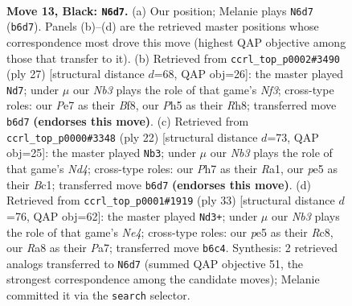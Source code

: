 \documentclass[11pt]{article}
\begin{document}
\clearpage

\begin{figure}[p]\centering
\begin{subfigure}{0.46\textwidth}\centering
\resizebox{\linewidth}{!}{%
\newchessgame
\chessboard[
  setfen={rnbr2k1/ppp1ppbp/1n6/P3P2p/2P5/1B3N2/1P3PP1/RNB1K2R b KQ - 0 13},
  showmover=false,
  pgfstyle=straightmove, color=movearrow, markmove={b6-d7}
]}
\caption{}
\end{subfigure}\hfill
\begin{subfigure}{0.46\textwidth}\centering
\resizebox{\linewidth}{!}{%
\newchessgame
\chessboard[
  setfen={2kr1b1r/ppp2ppp/2n2n2/4P3/5N2/5NP1/PPP4P/R1B2K1R b - - 0 14},
  showmover=false,
  pgfstyle=straightmove, color=movearrow, markmove={f6-d7}
]}
\caption{}
\end{subfigure}
\\[4pt]
\begin{subfigure}{0.46\textwidth}\centering
\resizebox{\linewidth}{!}{%
\newchessgame
\chessboard[
  setfen={r3k2r/pppb1pbp/6p1/2n1p3/2BNP3/2P5/PP3PPP/R1BKR3 w kq - 0 12},
  showmover=false,
  pgfstyle=straightmove, color=movearrow, markmove={d4-b3}
]}
\caption{}
\end{subfigure}\hfill
\begin{subfigure}{0.46\textwidth}\centering
\resizebox{\linewidth}{!}{%
\newchessgame
\chessboard[
  setfen={2rr2k1/pp2ppb1/6p1/2P1n2p/bPP1pP2/1N2P3/PB2B1PP/1R2K2R b K f3 0 17},
  showmover=false,
  pgfstyle=straightmove, color=movearrow, markmove={e5-d3}
]}
\caption{}
\end{subfigure}
\caption{\textbf{Move 13, Black: \texttt{N6d7}.} (a) Our position; Melanie plays \texttt{N6d7} (\texttt{b6d7}). Panels (b)--(d) are the retrieved master positions whose correspondence most drove this move (highest QAP objective among those that transfer to it). (b) Retrieved from \texttt{ccrl\_top\_p0002\#3490} (ply 27) [structural distance $d$=68, QAP obj=26]: the master played \texttt{Nd7}; under $\mu$ our \emph{Nb3} plays the role of that game's \emph{Nf3}; cross-type roles: our \emph{P}e7 as their \emph{B}f8, our \emph{P}h5 as their \emph{R}h8; transferred move \texttt{b6d7} \textbf{(endorses this move)}. (c) Retrieved from \texttt{ccrl\_top\_p0000\#3348} (ply 22) [structural distance $d$=73, QAP obj=25]: the master played \texttt{Nb3}; under $\mu$ our \emph{Nb3} plays the role of that game's \emph{Nd4}; cross-type roles: our \emph{P}h7 as their \emph{R}a1, our \emph{p}e5 as their \emph{B}c1; transferred move \texttt{b6d7} \textbf{(endorses this move)}. (d) Retrieved from \texttt{ccrl\_top\_p0001\#1919} (ply 33) [structural distance $d$=76, QAP obj=62]: the master played \texttt{Nd3+}; under $\mu$ our \emph{Nb3} plays the role of that game's \emph{Ne4}; cross-type roles: our \emph{p}e5 as their \emph{R}c8, our \emph{R}a8 as their \emph{P}a7; transferred move \texttt{b6c4}. Synthesis: 2 retrieved analogs transferred to \texttt{N6d7} (summed QAP objective 51, the strongest correspondence among the candidate moves); Melanie committed it via the \texttt{search} selector.}
\label{fig:thought-m25}
\end{figure}
\end{document}
